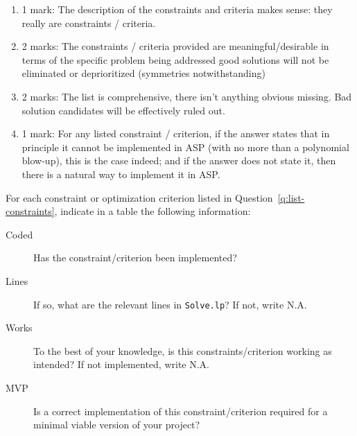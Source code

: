 \documentclass{article}
\begin{document}
\begin{Question}
\begin{Subquestion}
\begin{answer}
\begin{description}
\end{description}
\end{answer}
\begin{markingguide}
\begin{enumerate}
\item 1 mark: The description of the constraints and criteria makes sense: they really are constraints / criteria.
\item 2 marks: The constraints / criteria provided are meaningful/desirable in terms of the specific problem being addressed good solutions will not be eliminated or deprioritized (symmetries notwithstanding)
\item 2 marks: The list is comprehensive, there isn't anything obvious missing. Bad solution candidates will be effectively ruled out.
\item 1 mark: For any listed constraint / criterion, if the answer states that in principle it cannot be implemented in ASP (with no more than a polynomial blow-up), this is the case indeed; and if the answer does not state it, then there is a natural way to implement it in ASP.
\end{enumerate}
\end{markingguide}
\end{Subquestion}
\begin{Subquestion}
For each constraint or optimization criterion listed in Question~\ref{q:list-constraints}, indicate in a table the following information:
\begin{description}
\item[Coded] Has the constraint/criterion been implemented?
\item[Lines] If so, what are the relevant lines in \texttt{Solve.lp}? If not, write N.A.
\item[Works] To the best of your knowledge, is this constraints/criterion working as intended? If not implemented, write N.A.
\item[MVP] Is a correct implementation of this constraint/criterion required for a minimal viable version of your project?
\end{description}


\end{Subquestion}
\end{Question}
\end{document}
